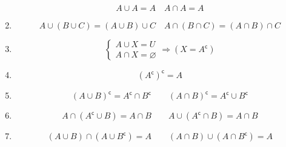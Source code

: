 \documentclass[a4paper, 12pt, oneside, titlepage, BCOR=1mm, DIV=12]{scrreprt}
\newcommand{\compl}{^\mathsf{c}}
\let\emptyset\varnothing
\let\emptyset\varnothing
\newcommand{\compl}{^\mathsf{c}}
\begin{document}
\begin{enumerate}
      \begin{displaymath}
        A\cup{A} = A \quad A\cap{A} = A
      \end{displaymath}

    \item \normalsize{}

      \begin{displaymath}
        A\cup{(B\cup{C})}=(A\cup{B})\cup{C} \quad A\cap{(B\cap{C})} = (A\cap{B})\cap{C}
      \end{displaymath}

    \item \normalsize{}
      \begin{displaymath}
        \left\{\begin{array}{l}
            A \cup{X} = U \\
            A \cap{X} = \emptyset
            \end{array} \Rightarrow (X = A\compl)
      \end{displaymath}

    \item \normalsize{}
      \begin{displaymath}
        (A\compl)\compl = A
      \end{displaymath}

    \item \normalsize{}
      \begin{displaymath}
        (A\cup{B})\compl = A\compl\cap{B\compl} \qquad (A\cap{B})\compl = A\compl\cup{B\compl}
      \end{displaymath}

    \item \normalsize{}
      \begin{displaymath}
        A\cap{(A\compl\cup{B})}=A\cap{B} \qquad A\cup{(A\compl\cap{B})}=A\cap{B}
      \end{displaymath}

    \item \normalsize{}
      \begin{displaymath}
        (A\cup{B})\cap{(A\cup{B\compl})} = A \qquad    (A\cap{B})\cup{(A\cap{B\compl})} = A
      \end{displaymath}

  \end{enumerate}
\end{document}
